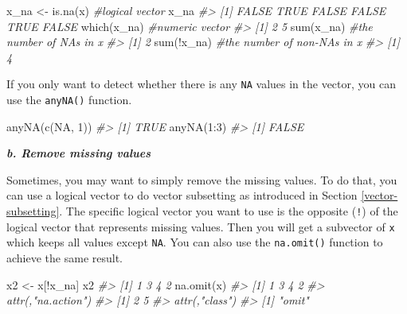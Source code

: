 \documentclass[
]{book}
\newenvironment{Shaded}{\begin{snugshade}}{\end{snugshade}}
\newcommand{\CommentTok}[1]{\textcolor[rgb]{0.56,0.35,0.01}{\textit{#1}}}
\newcommand{\ConstantTok}[1]{\textcolor[rgb]{0.00,0.00,0.00}{#1}}
\newcommand{\DecValTok}[1]{\textcolor[rgb]{0.00,0.00,0.81}{#1}}
\newcommand{\FunctionTok}[1]{\textcolor[rgb]{0.00,0.00,0.00}{#1}}
\newcommand{\NormalTok}[1]{#1}
\newcommand{\OtherTok}[1]{\textcolor[rgb]{0.56,0.35,0.01}{#1}}
\newcommand{\SpecialCharTok}[1]{\textcolor[rgb]{0.00,0.00,0.00}{#1}}
\begin{document}
\begin{Shaded}
\begin{Highlighting}[]
\NormalTok{x\_na }\OtherTok{\textless{}{-}} \FunctionTok{is.na}\NormalTok{(x)        }\CommentTok{\#logical vector     }
\NormalTok{x\_na}
\CommentTok{\#\textgreater{} [1] FALSE  TRUE FALSE FALSE  TRUE FALSE}
\FunctionTok{which}\NormalTok{(x\_na)             }\CommentTok{\#numeric vector}
\CommentTok{\#\textgreater{} [1] 2 5}
\FunctionTok{sum}\NormalTok{(x\_na)               }\CommentTok{\#the number of NAs in x }
\CommentTok{\#\textgreater{} [1] 2}
\FunctionTok{sum}\NormalTok{(}\SpecialCharTok{!}\NormalTok{x\_na)              }\CommentTok{\#the number of non{-}NAs in x}
\CommentTok{\#\textgreater{} [1] 4}
\end{Highlighting}
\end{Shaded}

If you only want to detect whether there is any \texttt{NA} values in the vector, you can use the \texttt{anyNA()} function.

\begin{Shaded}
\begin{Highlighting}[]
\FunctionTok{anyNA}\NormalTok{(}\FunctionTok{c}\NormalTok{(}\ConstantTok{NA}\NormalTok{, }\DecValTok{1}\NormalTok{))}
\CommentTok{\#\textgreater{} [1] TRUE}
\FunctionTok{anyNA}\NormalTok{(}\DecValTok{1}\SpecialCharTok{:}\DecValTok{3}\NormalTok{)}
\CommentTok{\#\textgreater{} [1] FALSE}
\end{Highlighting}
\end{Shaded}

\textbf{\emph{b. Remove missing values}}

Sometimes, you may want to simply remove the missing values. To do that, you can use a logical vector to do vector subsetting as introduced in Section \ref{vector-subsetting}. The specific logical vector you want to use is the opposite (\texttt{!}) of the logical vector that represents missing values. Then you will get a subvector of \texttt{x} which keeps all values except \texttt{NA}. You can also use the \texttt{na.omit()} function to achieve the same result.

\begin{Shaded}
\begin{Highlighting}[]
\NormalTok{x2 }\OtherTok{\textless{}{-}}\NormalTok{ x[}\SpecialCharTok{!}\NormalTok{x\_na]}
\NormalTok{x2}
\CommentTok{\#\textgreater{} [1] 1 3 4 2}
\FunctionTok{na.omit}\NormalTok{(x)}
\CommentTok{\#\textgreater{} [1] 1 3 4 2}
\CommentTok{\#\textgreater{} attr(,"na.action")}
\CommentTok{\#\textgreater{} [1] 2 5}
\CommentTok{\#\textgreater{} attr(,"class")}
\CommentTok{\#\textgreater{} [1] "omit"}
\end{Highlighting}
\end{Shaded}
\end{document}
